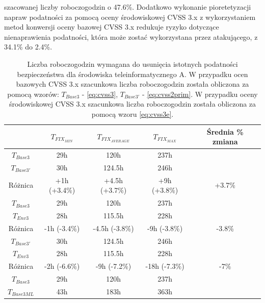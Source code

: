 szacowanej liczby roboczogodzin o 47.6\%. Dodatkowo wykonanie pioretetyzacji napraw podatności za pomocą oceny środowiskowej CVSS 3.x z wykorzystaniem metod konwersji oceny bazowej CVSS 3.x redukuje ryzyko dotyczące nienaprawienia podatności, która może zostać wykorzystana przez atakującego, z 34.1\% do 2.4\%.

\begin{table}[tbh]
\caption{Liczba roboczogodzin wymagana do usunięcia istotnych podatności bezpieczeństwa dla środowiska teleinformatycznego A. W przypadku ocen bazowych CVSS 3.x szacunkowa liczba roboczogodzin została obliczona za pomocą wzorów: $T_{Base3}$ - \ref{eq:cvss3}, $T_{Base3'}$ - \ref{eq:cvss2prim}. W przypadku oceny środowiskowej CVSS 3.x szacunkowa liczba roboczogodzin została obliczona za pomocą wzoru \ref{eq:cvss3e}.}
\begin{center}
\label{tab:chapter6:env_a:time_results_cvss_3}
\begin{tabular}{c|ccc|c}
\hline
                 & \textbf{$T_{FIX_{MIN}}$} & \textbf{$T_{FIX_{AVERAGE}}$} & \textbf{$T_{FIX_{MAX}}$ }  & Średnia \% zmiana \\
\hline
$T_{Base3}$      &                         29h &              120h &    237h         &        \\
$T_{Base3'}$     &                         30h &            124.5h &    246h         &         \\
Różnica          &                +1h (+3.4\%) &    +4.5h (+3.7\%) &  +9h (+3.8\%) & +3.7\%   \\  
\hline
$T_{Base3}$      &                         29h &            120h &      237h         &        \\
$T_{Env3}$       &                         28h &            115.5h &    228h         &         \\
Różnica          &                -1h (-3.4\%) &    -4.5h (-3.8\%) &  -9h (-3.8\%) & -3.8\%   \\  
\hline
$T_{Base3'}$     &                         30h &            124.5h &    246h         &        \\
$T_{Env3}$       &                         28h &            115.5h &    228h         &         \\
Różnica          &                -2h (-6.6\%) &    -9h (-7.2\%) &  -18h (-7.3\%) & -7\%   \\  
\hline
$T_{Base3}$    &                      29h &            120h &    237h         &         \\
$T_{Base3ML}$&                        43h &          183h &      363h         &         \\

\end{tabular}
\end{center}
\end{table}
